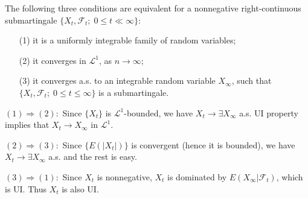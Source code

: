 \documentclass{report}
\begin{document}
\begin{prob}
	The following three conditions are equivalent for a nonnegative right-continuous
	submartingale \( \{X_t, \mathscr{F}_t;\; 0\le t\ll \infty \} \):
	\begin{itemize}
		\item[(1)] it is a uniformly integrable family of random variables;
		\item[(2)] it converges in \( \mathscr{L}^1 \), as \( n\to \infty \);
		\item[(3)] it converges a.s. to an integrable random variable \( X_{\infty } \), such that
		      \( \{X_t, \mathscr{F}_t;\; 0\le t\le \infty \} \) is a submartingale.
	\end{itemize}
\end{prob}
\begin{prf}
	\( (1) \Rightarrow (2): \) Since \( \{X_t\} \) is \( \mathscr{L}^1 \)-bounded, we have \( X_t\to \exists X_{\infty } \) a.s.
	UI property implies that \( X_t\to X_{\infty } \) in \( \mathscr{L}^1 \).
	
	\( (2) \Rightarrow (3): \) Since \( \{E(|X_t|)\} \) is convergent (hence it is bounded), we have
	\( X_t\to \exists X_{\infty } \) a.s. and the rest is easy.
	
	\( (3) \Rightarrow (1): \)
	Since \( X_t \) is nonnegative, \( X_t \) is dominated by \( E(X_{\infty }|\mathscr{F}_t) \),
	which is UI. Thus \( X_t \) is also UI. 
\end{prf}
\end{document}
